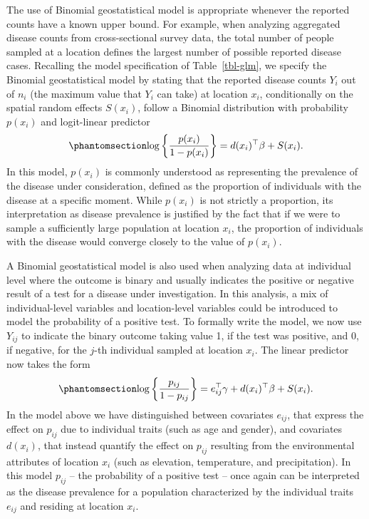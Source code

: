 \documentclass[
  letterpaper,
]{krantz}
\begin{document}
The use of Binomial geostatistical model is appropriate whenever the
reported counts have a known upper bound. For example, when analyzing
aggregated disease counts from cross-sectional survey data, the total
number of people sampled at a location defines the largest number of
possible reported disease cases. Recalling the model specification of
Table~\ref{tbl-glm}, we specify the Binomial geostatistical model by
stating that the reported disease counts \(Y_i\) out of \(n_i\) (the
maximum value that \(Y_i\) can take) at location \(x_i\), conditionally
on the spatial random effects \(S(x_i)\), follow a Binomial distribution
with probability \(p(x_i)\) and logit-linear predictor
\begin{equation}\phantomsection\label{eq-lp-bin}{
\log\left\{\frac{p(x_i)}{1-p(x_i)}\right\} = d(x_i)^\top \beta + S(x_i).
}\end{equation} In this model, \(p(x_i)\) is commonly understood as
representing the prevalence of the disease under consideration, defined
as the proportion of individuals with the disease at a specific moment.
While \(p(x_i)\) is not strictly a proportion, its interpretation as
disease prevalence is justified by the fact that if we were to sample a
sufficiently large population at location \(x_i\), the proportion of
individuals with the disease would converge closely to the value of
\(p(x_i)\).

A Binomial geostatistical model is also used when analyzing data at
individual level where the outcome is binary and usually indicates the
positive or negative result of a test for a disease under investigation.
In this analysis, a mix of individual-level variables and location-level
variables could be introduced to model the probability of a positive
test. To formally write the model, we now use \(Y_{ij}\) to indicate the
binary outcome taking value 1, if the test was positive, and 0, if
negative, for the \(j\)-th individual sampled at location \(x_i\). The
linear predictor now takes the form
\begin{equation}\phantomsection\label{eq-lp-bin-ind}{
\log\left\{\frac{p_{ij}}{1-p_{ij}}\right\} = e_{ij}^\top \gamma + d(x_{i})^\top \beta + S(x_i).
}\end{equation} In the model above we have distinguished between
covariates \(e_{ij}\), that express the effect on \(p_{ij}\) due to
individual traits (such as age and gender), and covariates \(d(x_i)\),
that instead quantify the effect on \(p_{ij}\) resulting from the
environmental attributes of location \(x_i\) (such as elevation,
temperature, and precipitation). In this model \(p_{ij}\) -- the
probability of a positive test -- once again can be interpreted as the
disease prevalence for a population characterized by the individual
traits \(e_{ij}\) and residing at location \(x_i\).
\end{document}
